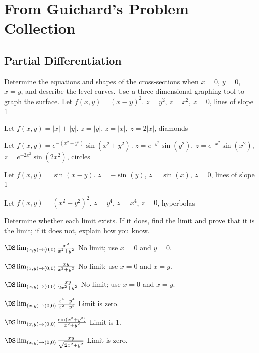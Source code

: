 \chapter{From Guichard's Problem Collection}

\section{Partial Differentiation} %
\begin{multicols}{2}



Determine the equations and shapes of the cross-sections when
$x=0$, $y=0$, $x=y$, and describe the level curves.
Use a three-dimensional graphing tool to graph the surface.
\problem Let $f(x,y)=(x-y)^2$.  %
\answer
$z=y^2$, $z=x^2$, $z=0$, lines of slope 1
\endanswer

\problem Let $f(x,y)=|x|+|y|$.  %
\answer
$z=|y|$, $z=|x|$, $z=2|x|$, diamonds
\endanswer

\problem Let $f(x,y)=e^{-(x^2+y^2)}\sin(x^2+y^2)$.  %
\answer
$z=e^{-y^2}\sin(y^2)$, $z=e^{-x^2}\sin(x^2)$, 
$z=e^{-2x^2}\sin(2x^2)$, circles
\endanswer

\problem Let $f(x,y)=\sin(x-y)$.  %
\answer
$z=-\sin(y)$, $z=\sin(x)$, 
$z=0$, lines of slope 1
\endanswer

\problem Let $f(x,y)=(x^2-y^2)^2$.  %
\answer
$z=y^4$, $z=x^4$, 
$z=0$, hyperbolas
\endanswer







Determine whether each limit exists. If it does, find the limit
and prove that it is the limit; if it does not, explain how you know.

\problem $\DS\lim_{(x,y)\to(0,0)}{x^2\over x^2+y^2}$ %
\answer
No limit; use $x=0$ and $y=0$.
\endanswer

\problem $\DS\lim_{(x,y)\to(0,0)}{xy\over x^2+y^2}$ %
\answer
No limit; use $x=0$ and $x=y$.
\endanswer

\problem $\DS\lim_{(x,y)\to(0,0)}{xy\over 2x^2+y^2}$ %
\answer
No limit; use $x=0$ and $x=y$.
\endanswer

\problem $\DS\lim_{(x,y)\to(0,0)}{x^4-y^4\over x^2+y^2}$ %
\answer
Limit is zero.
\endanswer

\problem $\DS\lim_{(x,y)\to(0,0)}{\sin(x^2+y^2)\over x^2+y^2}$ %
\answer
Limit is 1.
\endanswer

\problem $\DS\lim_{(x,y)\to(0,0)}{xy\over \sqrt{2x^2+y^2}}$ %
\answer
Limit is zero.
\endanswer


\end{multicols}
